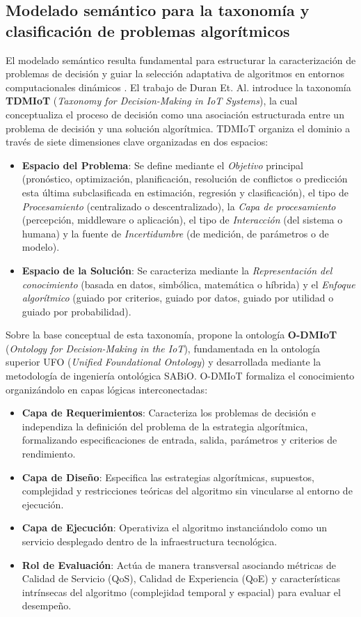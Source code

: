 \documentclass[12pt, letterpaper, oneside]{book}
\begin{document}
\subsection{Modelado semántico para la taxonomía y clasificación de problemas algorítmicos} 
El modelado semántico resulta fundamental para estructurar la caracterización de problemas de decisión y guiar la selección adaptativa de algoritmos en entornos computacionales dinámicos \cite{duran2026seleccion}. El trabajo de Duran Et. Al.  \cite{DURANPOLANCO2023100904} introduce la taxonomía \textbf{TDMIoT} (\textit{Taxonomy for Decision-Making in IoT Systems}), la cual conceptualiza el proceso de decisión como una asociación estructurada entre un problema de decisión y una solución algorítmica. TDMIoT organiza el dominio a través de siete dimensiones clave organizadas en dos espacios:
\begin{itemize} 
	\item \textbf{Espacio del Problema}: Se define mediante el \textit{Objetivo} principal (pronóstico, optimización, planificación, resolución de conflictos o predicción esta última subclasificada en estimación, regresión y clasificación), el tipo de \textit{Procesamiento} (centralizado o descentralizado), la \textit{Capa de procesamiento} (percepción, middleware o aplicación), el tipo de \textit{Interacción} (del sistema o humana) y la fuente de \textit{Incertidumbre} (de medición, de parámetros o de modelo). 
	\item \textbf{Espacio de la Solución}: Se caracteriza mediante la \textit{Representación del conocimiento} (basada en datos, simbólica, matemática o híbrida) y el \textit{Enfoque algorítmico} (guiado por criterios, guiado por datos, guiado por utilidad o guiado por probabilidad). 
\end{itemize} 
Sobre la base conceptual de esta taxonomía, \cite{duran2026seleccion} propone la ontología \textbf{O-DMIoT} (\textit{Ontology for Decision-Making in the IoT}), fundamentada en la ontología superior UFO (\textit{Unified Foundational Ontology}) y desarrollada mediante la metodología de ingeniería ontológica SABiO. O-DMIoT formaliza el conocimiento organizándolo en capas lógicas interconectadas: 
\begin{itemize} 
	\item \textbf{Capa de Requerimientos}: Caracteriza los problemas de decisión e independiza la definición del problema de la estrategia algorítmica, formalizando especificaciones de entrada, salida, parámetros y criterios de rendimiento. 
	\item \textbf{Capa de Diseño}: Especifica las estrategias algorítmicas, supuestos, complejidad y restricciones teóricas del algoritmo sin vincularse al entorno de ejecución. 
	\item \textbf{Capa de Ejecución}: Operativiza el algoritmo instanciándolo como un servicio desplegado dentro de la infraestructura tecnológica. 
	\item \textbf{Rol de Evaluación}: Actúa de manera transversal asociando métricas de Calidad de Servicio (QoS), Calidad de Experiencia (QoE) y características intrínsecas del algoritmo (complejidad temporal y espacial) para evaluar el desempeño. 
\end{itemize} 
\end{document}
